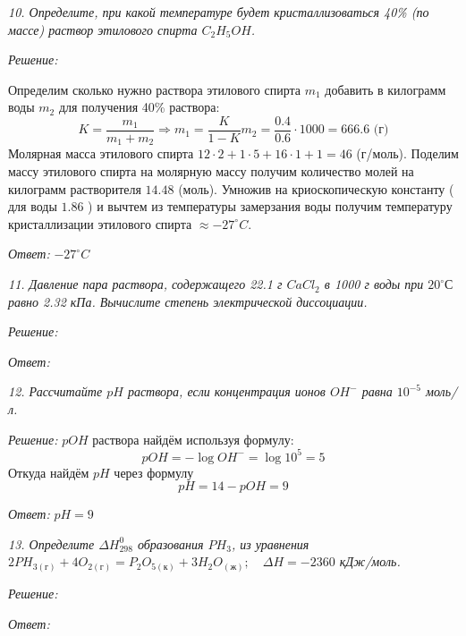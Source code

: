 \emph{10. Определите, при какой температуре будет кристаллизоваться 40\% 
(по массе) раствор этилового спирта \( C_2H_5OH \).}

\emph{Решение:}

Определим сколько нужно раствора этилового спирта \( m_1 \) добавить в 
килограмм воды \( m_2 \) для получения 40\% раствора:
\[
	K = \frac{m_1}{m_1 + m_2} \Rightarrow
	m_1 = \frac{K}{1-K}m_2 = \frac{0.4}{0.6}\cdot 1000 = 666.6 
	\text{ (г)}
\]
Молярная масса этилового спирта 
\( 12 \cdot 2 + 1 \cdot 5 + 16 \cdot 1 + 1 = 46 \) (г/моль). Поделим 
массу этилового спирта на молярную массу получим количество молей на 
килограмм растворителя \( 14.48 \) (моль). Умножив на 
криоскопическую константу ( для воды \( 1.86 \) ) и вычтем из 
температуры замерзания воды получим температуру кристаллизации 
этилового спирта \( \approx -27 ^\circ C\).

\emph{Ответ: } \( -27 ^\circ C\)

\pagebreak

\emph{11. Давление пара раствора, содержащего 22.1 г \( CaCl_2 \) в 
1000 г воды при \( 20 ^{\circ}С \) равно 2.32 кПа. Вычислите степень 
электрической диссоциации.}

\emph{Решение:}

\emph{Ответ: }

\pagebreak

\emph{12. Рассчитайте \( pH \) раствора, если концентрация ионов 
\( OH^{-} \) равна \( 10^{-5} \) моль/л.}

\emph{Решение:}
\( pOH \) раствора найдём используя формулу:
\[
	pOH = -\log{OH^{-}} = \log{10^5} = 5
\]
Откуда найдём \( pH \) через формулу
\[
	pH = 14 - pOH = 9
\]

\emph{Ответ: } \( pH = 9 \)

\pagebreak

\emph{13. Определите \( \Delta H^{0}_{298} \) образования \( PH_3\), 
из уравнения 
\(
    2PH_{3(\text{г})} + 4O_{2(\text{г})} = 
    P_2 O_{5(\text{к})} + 3H_2 O_{(\text{ж})};\quad
    \Delta H = -2360 
\) кДж/моль.}

\emph{Решение:}

\emph{Ответ: }

\pagebreak

